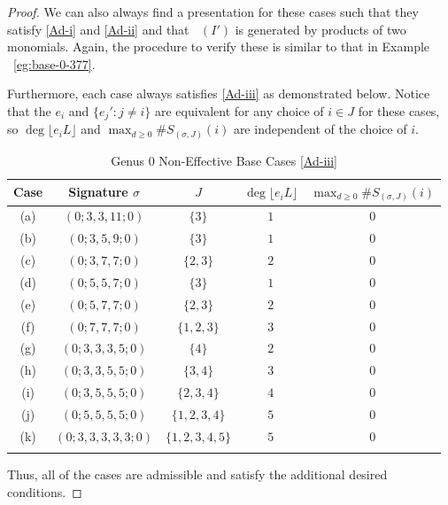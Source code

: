 \documentclass{amsart}
\theoremstyle{plain}
\theoremstyle{definition}
\theoremstyle{remark}
\numberwithin{equation}{section}
\DeclareMathOperator{\initial}{in_\prec}
\begin{document}
\begin{proof}
We can also always find a presentation for these cases such that
they satisfy \ref{Ad-i} and \ref{Ad-ii} and that $\initial(I')$ is
generated by products of two monomials. Again, the procedure to
verify these is similar to that in Example
~\ref{eg:base-0-377}.

Furthermore, each case always satisfies \ref{Ad-iii} as demonstrated below.
Notice that the $e_i$ and $\{e_j' : j \neq i\}$ are equivalent
for any choice of $i \in J$ for these cases, so $\deg \lfloor e_i L
\rfloor$ and $\max_{d \geq 0} \#S_{(\sigma, J)}(i)$ are
independent of the choice of $i$.

\begin{longtable}
	{| c | c | c || c | c |}
	\hline
	Case & Signature $\sigma$ & $J$ & $\deg \lfloor e_i L \rfloor$ &
	$\max_{d \geq 0} \#S_{(\sigma, J)}(i)$ \\
	\hline
	\hline

	(a) & $(0; 3, 3, 11; 0)$ & $\{3\}$ & $1$ & $0$ \\	\hline
	
	(b) & $(0; 3, 5, 9; 0)$ & $\{3\}$ & $1$ & $0$ \\ \hline
	
	(c) & $(0; 3, 7, 7; 0)$ & $\{2, 3\}$ & $2$ & $0$ \\ \hline
	
	(d) & $(0; 5, 5, 7; 0)$ & $\{3\}$ & $1$ & $0$ \\ \hline
	
	(e) & $(0; 5, 7, 7; 0)$ & $\{2, 3\}$ & $2$ & $0$ \\ \hline

	(f) & $(0; 7, 7, 7; 0)$ & $\{1, 2, 3\}$ & $3$ & $0$ \\ \hline

	(g) & $(0; 3, 3, 3, 5; 0)$ & $\{4\}$ & $2$ & $0$ \\ \hline
	
	(h) & $(0; 3, 3, 5, 5; 0)$ & $\{3, 4\}$ & $3$ & $0$ \\ \hline
	
	(i) & $(0; 3, 5, 5, 5; 0)$ & $\{2, 3, 4\}$ & $4$ & $0$ \\ \hline
	
	(j) & $(0; 5, 5, 5, 5; 0)$ & $\{1, 2, 3, 4\}$ & $5$ & $0$ \\ \hline

	(k) & $(0; 3, 3, 3, 3, 3; 0)$ & $\{1, 2, 3, 4, 5\}$ & $5$ & $0$ \\ \hline
	
	\caption{Genus 0 Non-Effective Base Cases \ref{Ad-iii}}
	\label{table:g-0-base-cases-admissibility}
\end{longtable}

Thus, all of the cases are admissible and satisfy the additional
desired conditions.
\end{proof}
\end{document}
